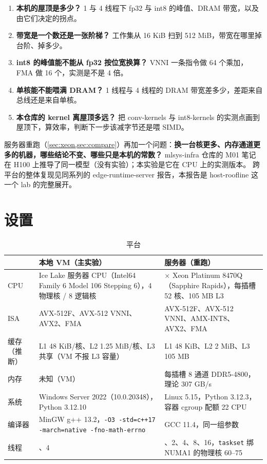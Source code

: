 \documentclass[11pt,a4paper]{ctexart}
\begin{document}
\begin{enumerate}[label=Q\arabic*.]
  \item \textbf{本机的屋顶是多少？} 1 与 4 线程下 fp32 与 int8 的峰值、DRAM 带宽，以及由它们决定的拐点。
  \item \textbf{带宽是一个数还是一张阶梯？} 工作集从 16 KiB 扫到 512 MiB，带宽在哪里掉台阶、掉多少。
  \item \textbf{int8 的峰值能不能从 fp32 按位宽换算？} VNNI 一条指令做 64 个乘加，FMA 做 16 个，实测是不是 4 倍。
  \item \textbf{单核能不能喂满 DRAM？} 1 线程与 4 线程的 DRAM 带宽差多少，差距来自总线还是来自单核。
  \item \textbf{本仓库的 kernel 离屋顶多远？} 把 conv-kernels 与 int8-kernels 的实测点画到屋顶下，算效率，判断下一步该减字节还是喂 SIMD。
\end{enumerate}

服务器重跑（\cref{sec:xeon,sec:compare}）再加一个问题：\textbf{换一台核更多、内存通道更多的机器，哪些结论不变、哪些只是本机的常数？}
mlsys-infra 仓库的 M01 笔记在 H100 上推导了同一模型（没有实验）；本实验是它在 CPU 上的实测版本。
跨平台的整体复现见同系列的 edge-runtime-server 报告，本报告是 host-roofline 这一个 lab 的完整展开。

\section{设置}\label{sec:setup}

\begin{table}[H]
\centering\small
\caption{平台}\label{tab:platform}
\begin{tabularx}{\linewidth}{>{\raggedright\arraybackslash}p{1.6cm} >{\raggedright\arraybackslash}X >{\raggedright\arraybackslash}X}
\toprule
 & 本地 VM（主实验） & 服务器（重跑） \\
\midrule
CPU & Ice Lake 服务器 CPU（Intel64 Family 6 Model 106 Stepping 6），4 物理核 / 8 逻辑核 & 2 × Xeon Platinum 8470Q（Sapphire Rapids），每插槽 52 核、105 MB L3 \\
ISA & AVX-512F、AVX-512 VNNI、AVX2、FMA & AVX-512F、AVX-512 VNNI、AMX-INT8、AVX2、FMA \\
缓存（推断） & L1 48 KiB/核、L2 1.25 MiB/核、L3 共享（VM 不报 L3 容量） & L1 48 KiB、L2 2 MiB、L3 105 MB \\
内存 & 未知（VM） & 每插槽 8 通道 DDR5-4800，理论 307 GB/s \\
系统 & Windows Server 2022（10.0.20348），Python 3.12.10 & Linux 5.15，Python 3.12.3，容器 cgroup 配额 22 CPU \\
编译器 & MinGW g++ 13.2，\texttt{-O3 -std=c++17 -march=native -fno-math-errno} & GCC 11.4，同一组参数 \\
线程 & 1、4 & 1、2、4、8、16，\texttt{taskset} 绑 NUMA1 的物理核 60--75 \\
\bottomrule
\end{tabularx}
\end{table}
\end{document}
